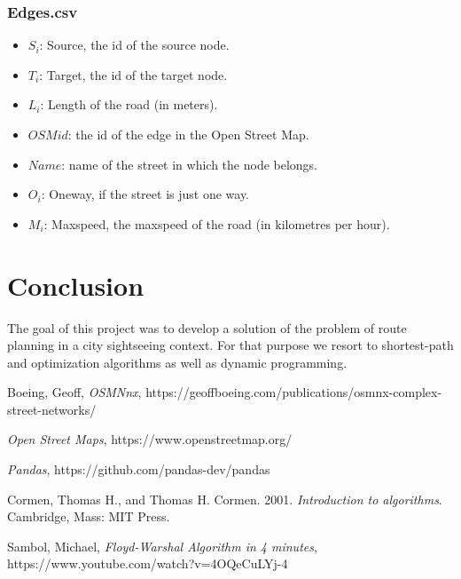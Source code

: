 \documentclass{article}
\begin{document}
\subsubsection*{Edges.csv}
\begin{itemize}
    \item $S_i$: Source, the id of the source node.
    \item $T_i$: Target, the id of the target node.
    \item $L_i$: Length of the road (in meters).
    \item $OSM id$: the id of the edge in the Open Street Map.
    \item $Name$: name of the street in which the node belongs.
    \item $O_i$: Oneway, if the street is just one way.
    \item $M_i$: Maxspeed, the maxspeed of the road (in kilometres per hour).
\end{itemize}

\section*{Conclusion}

The goal of this project was to develop a solution of the problem of route planning in a city sightseeing context. For that purpose we resort to shortest-path and optimization algorithms as well as dynamic programming.

\begin{thebibliography}{9}

Boeing, Geoff, \textit{OSMNnx}, https://geoffboeing.com/publications/osmnx-complex-street-networks/

\textit{Open Street Maps}, https://www.openstreetmap.org/

\textit{Pandas}, https://github.com/pandas-dev/pandas

Cormen, Thomas H., and Thomas H. Cormen. 2001. \textit{Introduction to algorithms}. Cambridge, Mass: MIT Press.

Sambol, Michael, \textit{Floyd-Warshal Algorithm in 4 minutes}, https://www.youtube.com/watch?v=4OQeCuLYj-4

\end{thebibliography}
\end{document}
